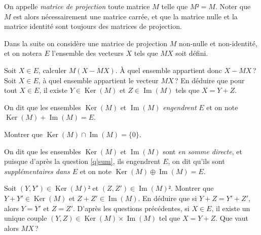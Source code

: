 \documentclass[a4paper, 11pt]{exam}
\DeclareMathOperator\Img{Im}
\DeclareMathOperator\Ker{Ker}
\begin{document}
On appelle \emph{matrice de projection} toute matrice \(M\) telle que \(M²=M\). Noter que \(M\) est alors nécessairement une matrice carrée, et que la matrice nulle et la matrice identité sont toujours des matrices de projection.

Dans la suite on considère une matrice de projection \(M\) non-nulle et non-identité, et on notera \(E\) l'ensemble des vecteurs \(X\) tels que \(MX\) soit défini.

\begin{questions}
	\question Soit \(X∈E\), calculer \(M(X-MX)\). À quel ensemble appartient donc \(X-MX\) ?
	\question\label{q|sum} Soit \(X∈E\), à quel ensemble appartient le vecteur \(MX\) ? En déduire que pour tout \(X∈E\), il existe \(Y∈\Ker(M)\) et \(Z∈\Img(M)\) tels que \(X=Y+Z\).
	
		On dit que les ensembles \(\Ker(M)\) et \(\Img(M)\) \emph{engendrent} \(E\) et on note \(\Ker(M)+\Img(M)=E\).

	\question Montrer que \(\Ker(M)∩\Img(M)=\{0\}\).
	
		On dit que les ensembles \(\Ker(M)\) et \(\Img(M)\) sont \emph{en somme directe}, et puisque d'après la question \ref{q|sum}, ils engendrent \(E\), on dit qu'ils sont \emph{supplémentaires dans \(E\)} et on note \(\Ker(M)⊕\Img(M)=E\).

	\question Soit $(Y, Y')∈\Ker(M)²$ et $(Z, Z')∈\Img(M)²$. Montrer que $Y+Y'∈\Ker(M)$ et $Z+Z'∈\Img(M)$. En déduire que si $Y+Z=Y'+Z'$, alors $Y=Y'$ et $Z=Z'$.
	\question D'après les questions précédentes, si $X∈E$, il existe un unique couple $(Y, Z)∈\Ker(M)×\Img(M)$ tel que $X=Y+Z$. Que vaut alors $MX$ ?
\end{questions}
\end{document}
